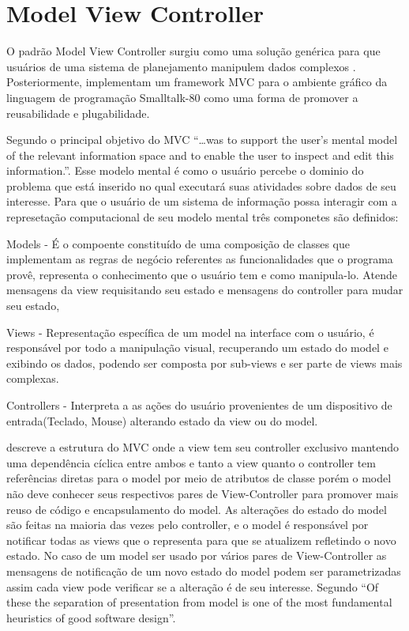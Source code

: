  


\section{Model View Controller}

O padrão Model View Controller surgiu como uma solução genérica para que
usuários de uma sistema de planejamento manipulem dados complexos
. Posteriormente, 
implementam um framework MVC para o ambiente gráfico da linguagem de programação
Smalltalk-80 como uma forma de promover a reusabilidade e plugabilidade.

Segundo  o principal objetivo do MVC ``\ldots was to
support the user's mental model of the relevant information space and to enable
the user to inspect and edit this information.''. Esse modelo mental é como o
usuário percebe o dominio do problema que está inserido no qual executará suas
atividades sobre dados de seu interesse. Para que o usuário de um sistema de
informação possa interagir com a represetação computacional  de seu modelo
mental três componetes são definidos:

Models - É o compoente constituído de uma composição de classes que implementam
as regras de negócio referentes as funcionalidades que o programa provê,
representa o  conhecimento que o usuário tem e como manipula-lo. Atende
mensagens da view requisitando seu estado e mensagens do controller para mudar
seu estado,

Views - Representação específica de um model na interface com o usuário, é 
responsável por todo a manipulação visual, recuperando um estado do model e
exibindo os dados, podendo ser composta por sub-views e ser parte de views mais
complexas.

Controllers - Interpreta a as ações do usuário provenientes de um dispositivo de
entrada(Teclado, Mouse) alterando estado da view ou do model.




 descreve a estrutura do MVC onde a view tem seu
controller exclusivo mantendo uma dependência cíclica entre ambos e tanto a view
quanto o controller tem referências diretas para o model por meio de atributos
de classe porém o model não deve conhecer seus respectivos pares de
View-Controller para promover mais reuso de código e encapsulamento do model. As
alterações do estado do model são feitas na maioria das vezes pelo controller, e
o model é responsável por notificar todas as views que o representa para que
se atualizem refletindo o novo estado. No caso de um model ser usado por vários
pares de View-Controller as mensagens de notificação de um novo estado do model
podem ser parametrizadas assim cada view pode verificar se a alteração é de seu
interesse. Segundo  ``Of these the separation of presentation
from model is one of the most fundamental heuristics of good software design''.

